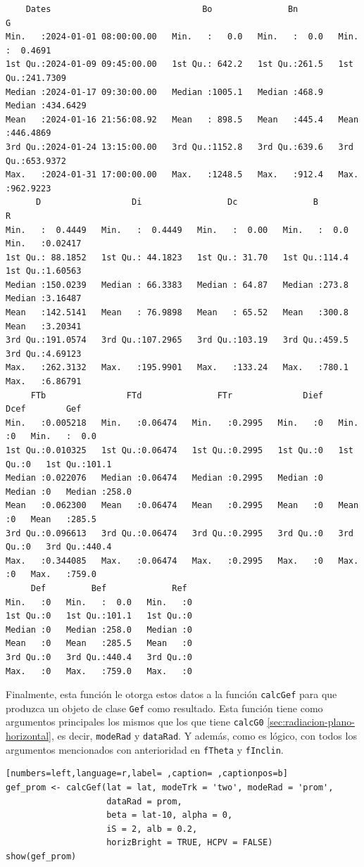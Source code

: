\begin{itemize}
\begin{verbatim}
    Dates                              Bo               Bn              G           
Min.   :2024-01-01 08:00:00.00   Min.   :   0.0   Min.   :  0.0   Min.   :  0.4691  
1st Qu.:2024-01-09 09:45:00.00   1st Qu.: 642.2   1st Qu.:261.5   1st Qu.:241.7309  
Median :2024-01-17 09:30:00.00   Median :1005.1   Median :468.9   Median :434.6429  
Mean   :2024-01-16 21:56:08.92   Mean   : 898.5   Mean   :445.4   Mean   :446.4869  
3rd Qu.:2024-01-24 13:15:00.00   3rd Qu.:1152.8   3rd Qu.:639.6   3rd Qu.:653.9372  
Max.   :2024-01-31 17:00:00.00   Max.   :1248.5   Max.   :912.4   Max.   :962.9223  
      D                  Di                 Dc               B               R          
Min.   :  0.4449   Min.   :  0.4449   Min.   :  0.00   Min.   :  0.0   Min.   :0.02417  
1st Qu.: 88.1852   1st Qu.: 44.1823   1st Qu.: 31.70   1st Qu.:114.4   1st Qu.:1.60563  
Median :150.0239   Median : 66.3383   Median : 64.87   Median :273.8   Median :3.16487  
Mean   :142.5141   Mean   : 76.9898   Mean   : 65.52   Mean   :300.8   Mean   :3.20341  
3rd Qu.:191.0574   3rd Qu.:107.2965   3rd Qu.:103.19   3rd Qu.:459.5   3rd Qu.:4.69123  
Max.   :262.3132   Max.   :195.9901   Max.   :133.24   Max.   :780.1   Max.   :6.86791  
     FTb                FTd               FTr              Dief        Dcef        Gef       
Min.   :0.005218   Min.   :0.06474   Min.   :0.2995   Min.   :0   Min.   :0   Min.   :  0.0  
1st Qu.:0.010325   1st Qu.:0.06474   1st Qu.:0.2995   1st Qu.:0   1st Qu.:0   1st Qu.:101.1  
Median :0.022076   Median :0.06474   Median :0.2995   Median :0   Median :0   Median :258.0  
Mean   :0.062300   Mean   :0.06474   Mean   :0.2995   Mean   :0   Mean   :0   Mean   :285.5  
3rd Qu.:0.096613   3rd Qu.:0.06474   3rd Qu.:0.2995   3rd Qu.:0   3rd Qu.:0   3rd Qu.:440.4  
Max.   :0.344085   Max.   :0.06474   Max.   :0.2995   Max.   :0   Max.   :0   Max.   :759.0  
     Def         Bef             Ref   
Min.   :0   Min.   :  0.0   Min.   :0  
1st Qu.:0   1st Qu.:101.1   1st Qu.:0  
Median :0   Median :258.0   Median :0  
Mean   :0   Mean   :285.5   Mean   :0  
3rd Qu.:0   3rd Qu.:440.4   3rd Qu.:0  
Max.   :0   Max.   :759.0   Max.   :0
\end{verbatim}
\end{itemize}

Finalmente, esta función le otorga estos datos a la función \texttt{calcGef} para que produzca un objeto de clase \texttt{Gef} como resultado. Esta función tiene como argumentos principales los mismos que los que tiene \texttt{calcG0} \ref{sec:radiacion-plano-horizontal}, es decir, \texttt{modeRad} y \texttt{dataRad}. Y además, como es lógico, con todos los argumentos mencionados con anterioridad en \texttt{fTheta} y \texttt{fInclin}.
\begin{lstlisting}[numbers=left,language=r,label= ,caption= ,captionpos=b]
gef_prom <- calcGef(lat = lat, modeTrk = 'two', modeRad = 'prom',
                    dataRad = prom,
                    beta = lat-10, alpha = 0,
                    iS = 2, alb = 0.2,
                    horizBright = TRUE, HCPV = FALSE)
show(gef_prom)
\end{lstlisting}

